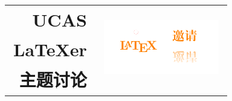 \documentclass[a0paper,fleqn]{betterposter}
\begin{document}
{{}{



}
}{
}{

\title{%
\begin{tabular}{rp{.35\linewidth}}
UCAS & \multirow{3}{*}{\includegraphics[width=.6\textwidth]{invitation.pdf}} \\%
\LaTeX er\\[.2\baselineskip]
主题讨论 \\ %
\end{tabular}
}


}
\end{document}
